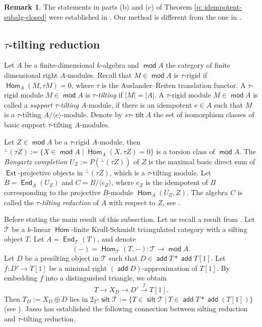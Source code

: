 \documentclass[12pt,a4paper,reqno]{amsart}
\theoremstyle{definition}
\newtheorem{remark}[theorem]{Remark}
\newcommand{\opname}[1]{\operatorname{\mathsf{#1}}}
\renewcommand{\mod}{\opname{mod}\nolimits}
\newcommand{\add}{\opname{add}\nolimits}
\newcommand{\Hom}{\opname{Hom}}
\newcommand{\Ext}{\opname{Ext}}
\newcommand{\End}{\opname{End}}
\newcommand{\xra}{\xrightarrow}
\begin{document}
\begin{remark}
The statements in parts (b) and (c) of Theorem \ref{p: idempotent-subalg-closed} were established in \cite{AC04}. Our method is different from the one in \cite{AC04}.
\end{remark}

\subsection{$\tau$-tilting reduction } \label{s:tau-reduction-closed} 
Let $A$ be a finite-dimensional $k$-algebra and $\mod A$ the category of finite dimensional right $A$-modules. Recall that $M\in \mod A$ is $\tau$-rigid if $\Hom_A(M,\tau M)=0$, where $\tau$ is the Auslander--Reiten translation functor. A $\tau$-rigid module $M\in \mod A$ is {\em $\tau$-tilting} if $|M|=|A|$. A $\tau$-rigid module $M\in \mod A$ is called a {\em support $\tau$-tilting} $A$-module, if there is an idempotent $e\in A$ such that $M$ is a $\tau$-tilting $A/\langle e\rangle$-module. Denote by $s\tau \text{-}\opname{tilt} A$ the set of isomorphism classes of basic support $\tau$-tilting $A$-modules.

Let $Z\in \mod A$ be a $\tau$-rigid $A$-module, then $^\perp (\tau Z):=\{X\in \mod A\mid \Hom_A(X,\tau Z)=0\}$ is a torsion class of $\mod A$. The {\em Bongartz completion} $U_Z:=P(^\perp(\tau Z))$ of $Z$ is the maximal basic direct sum of $\Ext$-projective objects in $^\perp(\tau Z)$, which is a $\tau$-tilting module. Let $B = \End_A (U_Z)$ and $C = B/ \langle e_Z \rangle$, where $e_Z$ is the idempotent of $B$ corresponding to the projective $B$-module $\Hom_A (U_Z, Z)$. The algebra $C$ is called the {\em $\tau$-tilting reduction} of $A$ with respect to $Z$, see \cite{J}.


 Before stating the main result of this subsection. Let us recall a result from \cite{J}.
  Let $\mathcal{T}$ be a $k$-linear $\Hom$-finite Krull-Schmidt triangulated category with a silting object $T$. Let $A = \End_{\mathcal{T}} (T)$, and denote \[\overline{(-)}=\Hom_\mathcal{T} (T, -) : \mathcal{T} \to \mod A.\] 
Let $D$ be a presilting object in $\mathcal{T}$ such that $D \in \add T * \add T[1]$. Let $f : D' \to T[1]$ be a minimal right $(\add D)$-approximation of $T[1]$. By embedding $f$ into a distinguished triangle, we obtain
\begin{equation}\label{tri:addT-addT[1]}
T  \to X_D \to D' \xra{f} T[1].  
\end{equation}
Then $T_D := X_D \oplus D$ lies in 2$_T$-$\opname{silt} \mathcal{T} := \{ T \in \opname{silt} \mathcal{T} ~|~  T \in \add T * \add (T[1]) \}$ (see \cite[Proposition 4.9]{J}). Jasso \cite{J} has established the following connection between silting reduction and $\tau$-tilting reduction.
\end{document}
